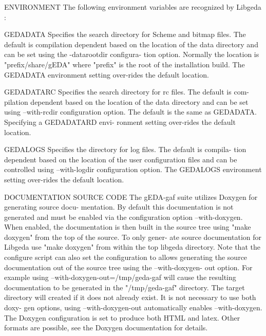 ENVIRONMENT
       The following environment variables are recognized by Libgeda :

          GEDADATA
              Specifies the search directory for Scheme and bitmap files.  The
              default  is  compilation  dependent based on the location of the
              data directory and can be set using the -datarootdir  configura-
              tion  option. Normally the location is "prefix/share/gEDA" where
              "prefix" is the root of the installation  build.   The  GEDADATA
              environment setting over-rides the default location.

          GEDADATARC
              Specifies the search directory for rc files. The default is com-
              pilation dependent based on the location of the  data  directory
              and  can  be  set  using  --with-rcdir configuration option. The
              default is the same as GEDADATA.  Specifying a GEDADATARD  envi-
              ronment setting over-rides the default location.

          GEDALOGS
              Specifies  the  directory for log files. The default is compila-
              tion dependent based on the location of the  user  configuration
              files  and  can  be controlled using --with-logdir configuration
              option. The GEDALOGS environment setting over-rides the  default
              location.

DOCUMENTATION
          SOURCE CODE
              The  gEDA-gaf suite utilizes Doxygen for generating source docu-
              mentation. By default this documentation is  not  generated  and
              must  be  enabled  via  the configuration option --with-doxygen.
              When enabled, the documentation is then built in the source tree
              using  "make doxygen" from the top of the source. To only gener-
              ate source documentation for Libgeda  use  "make  doxygen"  from
              within the top libgeda directory. Note that the configure script
              can also set the configuration to allows generating  the  source
              documentation  out  of the source tree using the --with-doxygen-
              out option. For example  using  --with-doxygen-out=/tmp/geda-gaf
              will  cause  the  resulting documentation to be generated in the
              "/tmp/geda-gaf" directory. The target directory will created  if
              it does not already exist. It is not necessary to use both doxy-
              gen  options,  using  --with-doxygen-out  automatically  enables
              --with-doxygen.   The  Doxygen  configuration  is set to produce
              both HTML and latex. Other formats are possible, see the Doxygen
              documentation for details.

